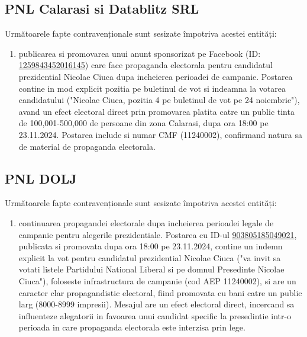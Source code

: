 \documentclass[a4paper,12pt]{article}
\begin{document}
\vspace{0.5cm}

\subsection{PNL Calarasi si Datablitz SRL}
Următoarele fapte contravenționale sunt sesizate împotriva acestei entități:

\begin{enumerate}[leftmargin=*, label=\arabic*.)]
    \item publicarea si promovarea unui anunt sponsorizat pe Facebook (ID: \href{https://www.facebook.com/ads/library/?id=1259843452016145}{1259843452016145}) care face propaganda electorala pentru candidatul prezidential Nicolae Ciuca dupa incheierea perioadei de campanie. Postarea contine in mod explicit pozitia pe buletinul de vot si indeamna la votarea candidatului ("Nicolae Ciuca, pozitia 4 pe buletinul de vot pe 24 noiembrie"), avand un efect electoral direct prin promovarea platita catre un public tinta de 100,001-500,000 de persoane din zona Calarasi, dupa ora 18:00 pe 23.11.2024. Postarea include si numar CMF (11240002), confirmand natura sa de material de propaganda electorala.
\end{enumerate}

\vspace{0.5cm}

\subsection{PNL DOLJ}
Următoarele fapte contravenționale sunt sesizate împotriva acestei entități:

\begin{enumerate}[leftmargin=*, label=\arabic*.)]
    \item continuarea propagandei electorale dupa incheierea perioadei legale de campanie pentru alegerile prezidentiale. Postarea cu ID-ul \href{https://www.facebook.com/ads/library/?id=903805185049021}{903805185049021}, publicata si promovata dupa ora 18:00 pe 23.11.2024, contine un indemn explicit la vot pentru candidatul prezidential Nicolae Ciuca ("va invit sa votati listele Partidului National Liberal si pe domnul Presedinte Nicolae Ciuca"), foloseste infrastructura de campanie (cod AEP 11240002), si are un caracter clar propagandistic electoral, fiind promovata cu bani catre un public larg (8000-8999 impresii). Mesajul are un efect electoral direct, incercand sa influenteze alegatorii in favoarea unui candidat specific la presedintie intr-o perioada in care propaganda electorala este interzisa prin lege.
\end{enumerate}
\end{document}
